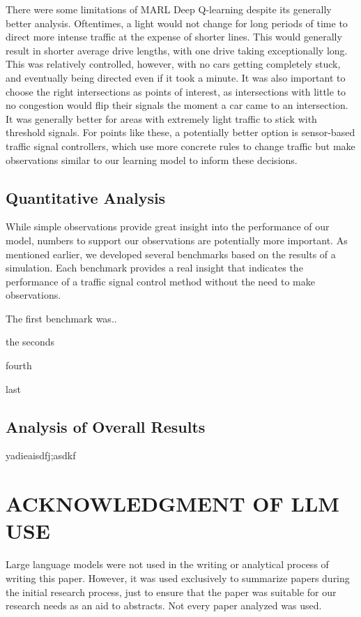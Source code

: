 \documentclass[conference]{IEEEtran}
\begin{document}
There were some limitations of MARL Deep Q-learning despite its generally better analysis. Oftentimes, a light would not change for long periods of time to direct more intense traffic at the expense of shorter lines. This would generally result in shorter average drive lengths, with one drive taking exceptionally long. This was relatively controlled, however, with no cars getting completely stuck, and eventually being directed even if it took a minute. It was also important to choose the right intersections as points of interest, as intersections with little to no congestion would flip their signals the moment a car came to an intersection. It was generally better for areas with extremely light traffic to stick with threshold signals. For points like these, a potentially better option is sensor-based traffic signal controllers, which use more concrete rules to change traffic but make observations similar to our learning model to inform these decisions. 

\subsection{Quantitative Analysis}

While simple observations provide great insight into the performance of our model, numbers to support our observations are potentially more important. As mentioned earlier, we developed several benchmarks based on the results of a simulation. Each benchmark provides a real insight that indicates the performance of a traffic signal control method without the need to make observations. 

The first benchmark was..

the seconds

fourth

last

\subsection{Analysis of Overall Results}

yadieaisdfj;asdkf

\section{ACKNOWLEDGMENT OF LLM USE}

Large language models were not used in the writing or analytical process of writing this paper. However, it was used exclusively to summarize papers during the initial research process, just to ensure that the paper was suitable for our research needs as an aid to abstracts. Not every paper analyzed was used. 
\end{document}
